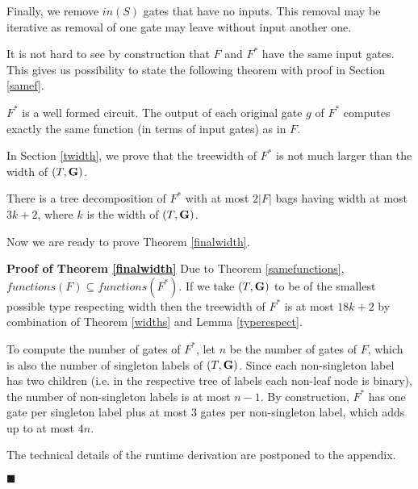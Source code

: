 \documentclass{llncs}
\begin{document}
Finally, we remove $in(S)$ gates that have no inputs.
This removal may be iterative as removal of one gate may leave without input another one.


It is not hard to see by construction that $F$ and $F^*$ have the same input gates.
This gives us possibility to state the following theorem with proof in Section \ref{samef}.

\begin{theorem} \label{samefunctions}
$F^*$ is a well formed circuit.
The output of each original gate $g$ of $F^*$  computes exactly the same function (in terms of input gates)
 as in $F$. 
\end{theorem}

In Section \ref{twidth}, we prove that the treewidth of $F^*$ is not much larger than the width of
$(T,{\bf G})$.

\begin{theorem} \label{widths}
There is a tree decomposition of $F^*$ with at most $2|F|$ bags having width at most $3k+2$, where $k$ is the width of $(T,{\bf G})$. 
\end{theorem}

Now we are ready to prove Theorem \ref{finalwidth}.

{\bf Proof of Theorem \ref{finalwidth}} 
Due to Theorem \ref{samefunctions}, $functions(F) \subseteq functions(F^*)$. If we take $(T,{\bf G})$ to be of the smallest possible
type respecting width then the treewidth of $F^*$ is at most $18k+2$ by combination of Theorem \ref{widths} and Lemma \ref{typerespect}.

To compute the number of gates of $F^*$, let $n$ be the number of gates of $F$, which is also the number of
singleton labels of $(T,{\bf G})$. Since each non-singleton label has two children (i.e. in the respective
tree of labels each non-leaf node is binary), the number of non-singleton labels is at most $n-1$.
By construction, $F^*$ has one gate per singleton label plus at most $3$ gates per non-singleton label,
which adds up to at most $4n$.

The technical details of the runtime derivation are postponed to the appendix.
\begin{comment}
The key aspect is the data structure used for representation of the clique decomposition 
$(T,{\bf G})$. Instead of associating each node of $T$ with a graph, the node is associated 
with the corresponding operation that creates the graph. 
We show that, given this representation, the desired tree decomposition can be constructed in 
$O(k)$ per node of $T$. Then we show that $T$ contains $O(kn)$ nodes, 
immediately implying the desired $O(k^2n)$ bound on the runtime.
\end{comment}
$\blacksquare$
\end{document}
